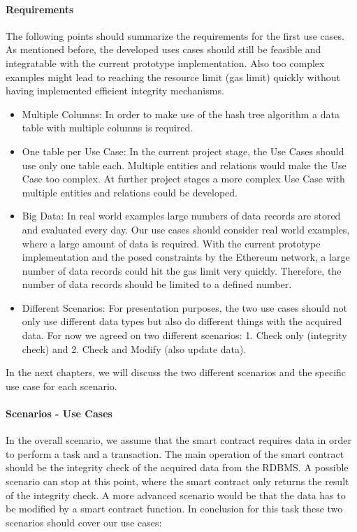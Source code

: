 \paragraph{Requirements}
The following points should summarize the requirements for the first use cases. As mentioned before, the developed uses cases should still be feasible and integratable with the current prototype implementation. Also too complex examples might lead to reaching the resource limit (gas limit) quickly without having implemented efficient integrity mechanisms.

\begin{itemize}
\item Multiple Columns:
In order to make use of the hash tree algorithm a data table with multiple columns is required.
\item One table per Use Case:
In the current project stage, the Use Cases should use only one table each. Multiple entities and relations would make the Use Case too complex. At further project stages a more complex Use Case with multiple entities and relations could be developed.
\item Big Data:
In real world examples large numbers of data records are stored and evaluated every day. Our use cases should consider real world examples, where a large amount of data is required. With the current prototype implementation and the posed constraints by the Ethereum network, a large number of data records could hit the gas limit very quickly. Therefore, the number of data records should be limited to a defined number.
\item Different Scenarios:
For presentation purposes, the two use cases should not only use different data types but also do different things with the acquired data. For now we agreed on two different scenarios: 1. Check only (integrity check) and 2. Check and Modify (also update data).
\end{itemize}

In the next chapters, we will discuss the two different scenarios and the specific use case for each scenario.

\paragraph{Scenarios - Use Cases}
In the overall scenario, we assume that the smart contract requires data in order to perform a task and a transaction. The main operation of the smart contract should be the integrity check of the acquired data from the RDBMS. A possible scenario can stop at this point, where the smart contract only returns the result of the integrity check. A more advanced scenario would be that the data has to be modified by a smart contract function. In conclusion for this task these two scenarios should cover our use cases:




